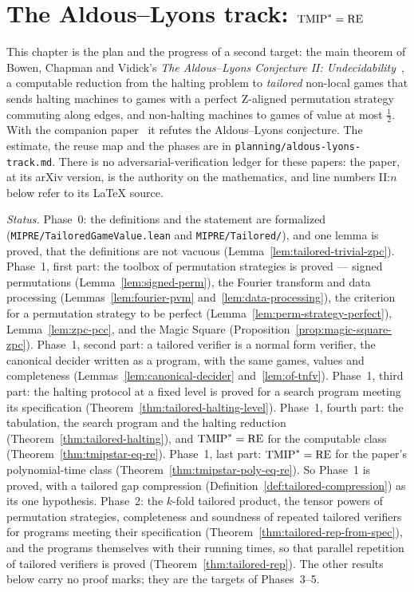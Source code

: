 \section{The Aldous--Lyons track: $\mathrm{TMIP}^* = \mathrm{RE}$}
\label{ch:tailored}

This chapter is the plan and the progress of a second target: the main theorem of Bowen, Chapman
and Vidick's \emph{The Aldous--Lyons Conjecture II: Undecidability}~\cite{BCV25}, a computable
reduction from the halting problem to \emph{tailored} non-local games that sends halting
machines to games with a perfect Z-aligned permutation strategy commuting along edges, and
non-halting machines to games of value at most $\frac12$. With the companion
paper~\cite{BCLV24} it refutes the Aldous--Lyons conjecture. The estimate, the reuse map and
the phases are in \texttt{planning/aldous-lyons-track.md}. There is no adversarial-verification
ledger for these papers: the paper, at its arXiv version, is the authority on the mathematics,
and line numbers II:$n$ below refer to its LaTeX source.

\emph{Status.} Phase~0: the definitions and the statement are formalized
(\texttt{MIPRE/TailoredGameValue.lean} and \texttt{MIPRE/Tailored/}), and one lemma is proved,
that the definitions are not vacuous (Lemma~\ref{lem:tailored-trivial-zpc}). Phase~1, first
part: the toolbox of permutation strategies is proved --- signed permutations
(Lemma~\ref{lem:signed-perm}), the Fourier transform and data processing
(Lemmas~\ref{lem:fourier-pvm} and~\ref{lem:data-processing}), the criterion for a permutation
strategy to be perfect (Lemma~\ref{lem:perm-strategy-perfect}), Lemma~\ref{lem:zpc-pcc}, and the
Magic Square (Proposition~\ref{prop:magic-square-zpc}). Phase~1, second part: a tailored
verifier is a normal form verifier, the canonical decider written as a program, with the same
games, values and completeness (Lemmas~\ref{lem:canonical-decider} and~\ref{lem:of-tnfv}).
Phase~1, third part: the halting protocol at a fixed level is proved for a search program
meeting its specification (Theorem~\ref{thm:tailored-halting-level}). Phase~1, fourth part: the
tabulation, the search program and the halting reduction (Theorem~\ref{thm:tailored-halting}),
and $\mathrm{TMIP}^* = \mathrm{RE}$ for the computable class (Theorem~\ref{thm:tmipstar-eq-re}).
Phase~1, last part: $\mathrm{TMIP}^* = \mathrm{RE}$ for the paper's polynomial-time class
(Theorem~\ref{thm:tmipstar-poly-eq-re}). So Phase~1 is proved, with a tailored gap compression
(Definition~\ref{def:tailored-compression}) as its one hypothesis.
Phase~2: the $k$-fold tailored product, the tensor powers of permutation strategies,
completeness and soundness of repeated tailored verifiers for programs meeting their
specification (Theorem~\ref{thm:tailored-rep-from-spec}), and the programs themselves with their
running times, so that parallel repetition of tailored verifiers is proved
(Theorem~\ref{thm:tailored-rep}). The other results below carry no proof marks; they are the
targets of Phases~3--5.

